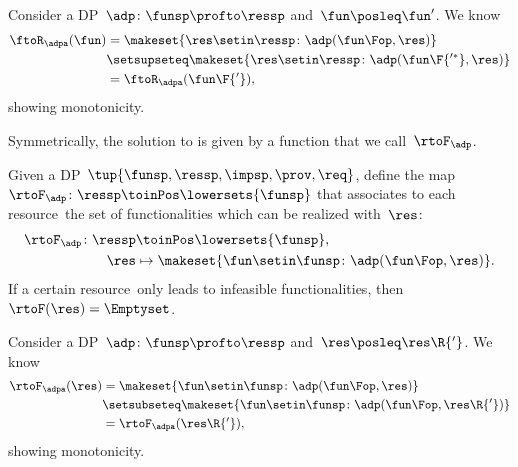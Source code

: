 \begin{remark}[Monotonicity]
    Consider a DP~$\adp\colon\funsp\profto\ressp$ and~$\fun\posleq \fun'$.
    We know
    \begin{equation}
        \begin{aligned}
            \ftoR_\adpa(\fun) & =\makeset{ \res \setin \ressp \colon \adp(\fun\Fop, \res)} \\
                              & \setsupseteq \makeset{ \res \setin \ressp \colon \adp(\fun\F{'^*}, \res)} \\
                              & =\ftoR_\adpa(\fun\F{'}),
        \end{aligned}
    \end{equation}
    showing monotonicity.
\end{remark}

Symmetrically, the solution to \FixResMaxFun is given by a function that we call~$\rtoF_\adp$.

\begin{definition}
    \label{def:rtoF-dp}
    Given a DP~$\tup{ \funsp,\ressp,\impsp,\prov,\req}$, define the map~$\rtoF_{\adp}\colon \ressp\toinPos  \lowersets{\funsp}$ that associates to each resource~\res the set of functionalities which can be realized with~$\res$:
    \begin{equation}
        \begin{aligned}
            \rtoF_{\adp}\colon \ressp & \toinPos \lowersets{\funsp}, \\
            \res                      & \mapsto \makeset{ \fun \setin \funsp \colon \adp(\fun\Fop, \res)}.
        \end{aligned}
    \end{equation}
    If a certain resource~\res only leads to infeasible functionalities, then~$\rtoF(\res)=\Emptyset$.
\end{definition}

\begin{remark}[Monotonicity]
    Consider a DP~$\adp\colon\funsp\profto\ressp$ and~$\res\posleq \res\R{'}$.
    We know
    \begin{equation}
        \begin{aligned}
            \rtoF_\adpa(\res) & =\makeset{ \fun \setin \funsp \colon \adp(\fun\Fop, \res)} \\
                              & \setsubseteq \makeset{ \fun \setin \funsp \colon \adp(\fun\Fop, \res\R{'})} \\
                              & =\rtoF_\adpa(\res\R{'}),
        \end{aligned}
    \end{equation}
    showing monotonicity.
\end{remark}

